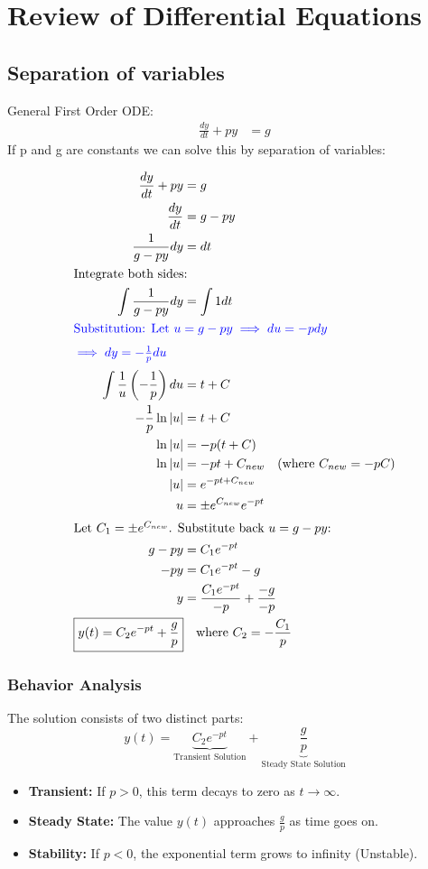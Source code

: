 \documentclass[11pt]{article}
\begin{document}
\section{Review of Differential Equations}
\subsection{Separation of variables}
General First Order ODE:
\begin{align*}
\frac{dy}{dt}+py &= g
\end{align*}
If p and g are constants we can solve this by separation of variables:

\begin{align*}
    \frac{dy}{dt} + py &= g \\
    \frac{dy}{dt} &= g - py \\
    \frac{1}{g - py} dy &= dt \\
    \intertext{Integrate both sides:}
    \int \frac{1}{g - py} dy &= \int 1 dt \\
    \intertext{\textcolor{blue}{Substitution: Let $u = g - py \implies du = -p dy$}}
    \intertext{\textcolor{blue}{$\implies dy = -\frac{1}{p}du$}}
    \int \frac{1}{u} \left( -\frac{1}{p} \right) du &= t + C \\
    -\frac{1}{p} \ln|u| &= t + C \\
    \ln|u| &= -p(t + C) \\
    \ln|u| &= -pt + C_{new} \quad \text{(where } C_{new} = -pC \text{)} \\
    |u| &= e^{-pt + C_{new}} \\
    u &= \pm e^{C_{new}} e^{-pt} \\
    \intertext{Let $C_1 = \pm e^{C_{new}}$. Substitute back $u = g - py$:}
    g - py &= C_1 e^{-pt} \\
    -py &= C_1 e^{-pt} - g \\
    y &= \frac{C_1 e^{-pt}}{-p} + \frac{-g}{-p} \\
    \boxed{y(t) = C_2 e^{-pt} + \frac{g}{p}} &\quad \text{where } C_2 = -\frac{C_1}{p}
\end{align*}

\subsubsection*{Behavior Analysis}
The solution consists of two distinct parts:
\begin{equation*}
    y(t) = \underbrace{C_2 e^{-pt}}_{\text{Transient Solution}} + \underbrace{\frac{g}{p}}_{\text{Steady State Solution}}
\end{equation*}
\begin{itemize}
    \item \textbf{Transient:} If $p > 0$, this term decays to zero as $t \to \infty$.
    \item \textbf{Steady State:} The value $y(t)$ approaches $\frac{g}{p}$ as time goes on.
    \item \textbf{Stability:} If $p < 0$, the exponential term grows to infinity (Unstable).
\end{itemize}
\end{document}
